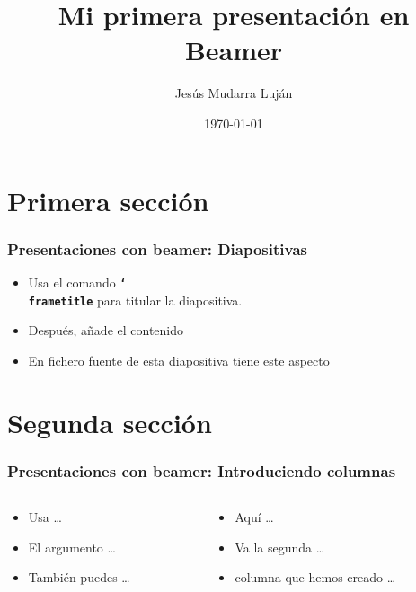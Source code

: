 \documentclass{beamer}
\title{Mi primera presentación en Beamer}
\author{Jesús Mudarra Luján}
\institute{Curso de Introducción a \LaTeX}
\date{\today}
\newcommand{\bftt}[1]{\textbf{\texttt{#1}}}
\newcommand{\cmd}[1]{{\color[HTML]{008000}\bftt{#1}}}
\newcommand{\bs}{\char`\\}
\newcommand{\cmdbs}[1]{\cmd{\bs#1}}
\begin{document}
\begin{frame}
\titlepage %
\end{frame}

\begin{frame}
\tableofcontents
\end{frame}

\section{Primera sección}

\begin{frame}[fragile]
\frametitle{Presentaciones con beamer: Diapositivas}

\begin{itemize}
\item Usa el comando \cmdbs{frametitle} para titular la diapositiva.
\item Después, añade el contenido
\item En fichero fuente de esta diapositiva tiene este aspecto
\end{itemize}

\end{frame}

\section{Segunda sección}

\begin{frame}
\frametitle{Presentaciones con beamer: Introduciendo columnas}

\begin{columns}


\begin{column}{0.4\textwidth}
\begin{itemize}
\item Usa \dots
\item El argumento \dots
\item También puedes \dots
\end{itemize}
\end{column}


\begin{column}{0.6\textwidth}
\begin{itemize}
\pause %
\item Aquí \dots
\item Va la segunda \dots
\item columna que hemos creado \dots
\end{itemize}
\end{column}

\end{columns}

\end{frame}
\end{document}
